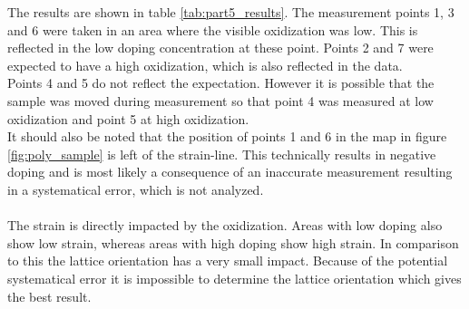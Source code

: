 \documentclass[12pt,a4paper]{article}
\begin{document}
The results are shown in table \ref{tab:part5_results}. The measurement points 1, 3 and 6 were taken in an area where the visible oxidization was low. This is reflected in the low doping concentration at these point. Points 2 and 7 were expected to have a high oxidization, which is also reflected in the data.\\
Points 4 and 5 do not reflect the expectation. However it is possible that the sample was moved during measurement so that point 4 was measured at low oxidization and point 5 at high oxidization.\\
It should also be noted that the position of points 1 and 6 in the map in figure \ref{fig:poly_sample} is left of the strain-line. This technically results in negative doping and is most likely a consequence of an inaccurate measurement resulting in a systematical error, which is not analyzed.\\
\\
The strain is directly impacted by the oxidization. Areas with low doping also show low strain, whereas areas with high doping show high strain. In comparison to this the lattice orientation has a very small impact. Because of the potential systematical error it is impossible to determine the lattice orientation which gives the best result.
\end{document}
